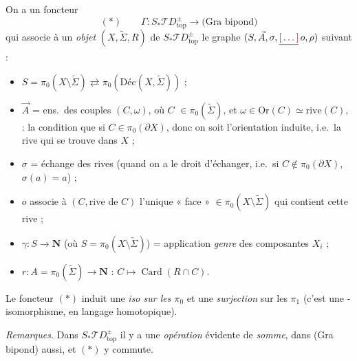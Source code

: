 \documentclass[11pt,a4paper]{article}
\begin{document}
On a un foncteur
\[
(*)\qquad \Gamma : S_{*}\mathcal{T}D^{\pm}_{\mathrm{top}} \longrightarrow
\text{(Gra bipond)}
\]
qui associe à un \emph{objet} $(X, \widetilde{\Sigma}, R)$ de
$S_{*}\mathcal{T}D^{\pm}_{\mathrm{top}}$ le graphe 
$(S, \vec{A}, \sigma, \struck{\ill{}}\, o, \rho)$ suivant :
\begin{itemize}
  \item[] $S = \pi_0(X \setminus \widetilde{\Sigma}) \rightleftarrows
    \pi_0(\mathrm{Déc}(X, \widetilde{\Sigma}))$ ;
  \item[] $\vec{A}$ = ens.\ des couples $(C, \omega)$, où
    $C$  $\in \pi_0(\widetilde{\Sigma})$, et
    $\omega \in \mathrm{Or}(C) \simeq \mathrm{rive}(C)$, \ill{} : la condition que si $C \in \pi_0(\partial X)$,
    donc on soit l'orientation induite, i.e.\ la rive qui se trouve dans
    $X$ ;
  \item[] $\sigma$ = échange des rives (quand on a le droit d'échanger,
    i.e.\ si $C \notin \pi_0(\partial X)$, \ill{} $\sigma(a) = a$) ;
  \item[] $o$ associe à $(C, \text{rive de } C)$ l'unique « face »
    $\in \pi_0(X \setminus \widetilde{\Sigma})$ qui contient cette rive ;
  \item[] $\gamma : S \to \mathbf{N}$ (où $S = \pi_0(X \setminus
    \widetilde{\Sigma})$) = application \emph{genre} des composantes $X_i$ ;
  \item[] $r : A = \pi_0(\widetilde{\Sigma}) \to \mathbf{N}$ :
    $C \mapsto \operatorname{Card}(R \cap C)$.
\end{itemize}

Le foncteur $(*)$  induit une \emph{iso sur les
$\pi_0$} et une \emph{surjection} sur les $\pi_1$ (c'est une
-isomorphisme, en langage homotopique).

\struck{\ill{}}

\emph{Remarques.} Dans $S_{*}\mathcal{T}D^{\pm}_{\mathrm{top}}$ il y a une
\emph{opération} évidente de \emph{somme}, dans (Gra bipond)
 aussi, et $(*)$ y commute.
\end{document}
